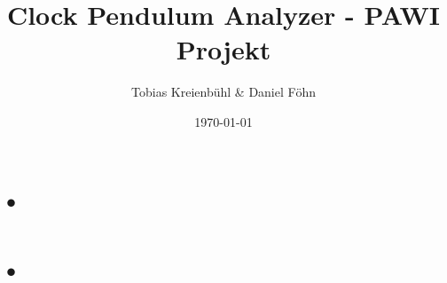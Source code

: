 \documentclass{beamer}
\title{Clock Pendulum Analyzer - PAWI Projekt}
\author{Tobias Kreienbühl \& Daniel Föhn}
\institute{Hochschule Luzern, Informatik}
\date{\today}
\begin{document}
	\begin{frame}
		\titlepage
	\end{frame}


	\section{•}
	\begin{frame}
		
	\end{frame}
	
	
	\section{•}
	\begin{frame}

	\end{frame}
\end{document}
